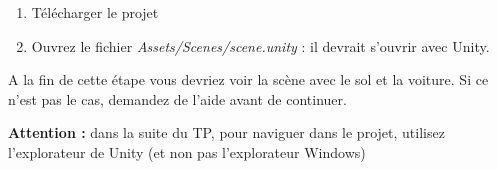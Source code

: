 
\begin{enumerate}
\item Télécharger le projet
\item Ouvrez le fichier \textit{Assets/Scenes/scene.unity} : il devrait s'ouvrir avec Unity.
\end{enumerate}

A la fin de cette étape vous devriez voir la scène avec le sol et la voiture. Si ce n'est pas le cas, demandez de l'aide avant de continuer.

\textbf{Attention :} dans la suite du TP, pour naviguer dans le projet, utilisez l'explorateur de Unity (et non pas l'explorateur Windows)